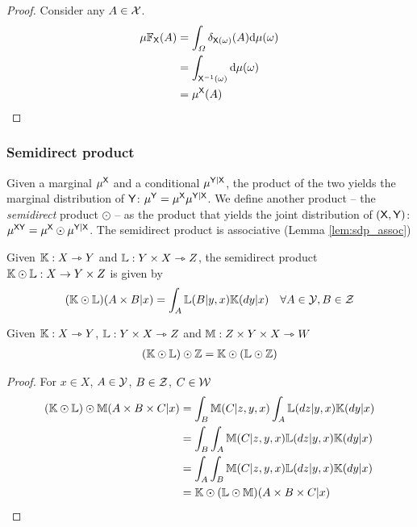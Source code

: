 \begin{proof}
Consider any $A\in \mathcal{X}$.
\begin{align}
	\mu \mathbb{F}_{\mathsf{X}}(A) &= \int_\Omega \delta_{\mathsf{X}(\omega)}(A) \mathrm{d}\mu(\omega)\\
	&= \int_{\mathsf{X}^{-1}(\omega)} \mathrm{d}\mu(\omega)\\
	&= \mu^{\mathsf{X}}(A)
\end{align}
\end{proof}

\subsubsection{Semidirect product}

Given a marginal $\mu^{\mathsf{X}}$ and a conditional $\mu^{\mathsf{Y}|\mathsf{X}}$, the product of the two yields the marginal distribution of $\mathsf{Y}$: $\mu^{\mathsf{Y}}=\mu^{\mathsf{X}}\mu^{\mathsf{Y}|\mathsf{X}}$. We define another product -- the \emph{semidirect} product $\odot$ -- as the product that yields the joint distribution of $(\mathsf{X},\mathsf{Y})$: $\mu^{\mathsf{XY}}=\mu^{\mathsf{X}}\odot\mu^{\mathsf{Y}|\mathsf{X}}$. The semidirect product is associative (Lemma \ref{lem:sdp_assoc})

\begin{definition}\label{def:copyproduct}
Given $\mathbb{K}:X\rightarrowtriangle Y$ and $\mathbb{L}:Y\times X\rightarrowtriangle Z$, the semidirect product $\mathbb{K}\odot\mathbb{L}:X\to Y\times Z$ is given by
\begin{align}
    (\mathbb{K}\odot\mathbb{L})(A\times B|x) &= \int_A \mathbb{L}(B|y,x)\mathbb{K}(dy|x)&\forall A\in \mathcal{Y},B\in\mathcal{Z}
\end{align}
\end{definition}


\begin{lemma}\label{lem:sdp_assoc}
Given $\mathbb{K}:X\rightarrowtriangle Y$, $\mathbb{L}:Y\times X\rightarrowtriangle Z$ and $\mathbb{M}:Z\times Y\times X\rightarrowtriangle W$
\begin{align}
    (\mathbb{K}\odot \mathbb{L})\odot \mathbb{Z} &= \mathbb{K}\odot(\mathbb{L}\odot\mathbb{Z})\\
\end{align}
\end{lemma}

\begin{proof}
For $x\in X$, $A\in \mathcal{Y}$, $B\in \mathcal{Z}$, $C\in \mathcal{W}$
\begin{align}
    (\mathbb{K}\odot \mathbb{L})\odot \mathbb{M}(A\times B\times C |x) &= \int_B \mathbb{M}(C|z, y,x)\int_A \mathbb{L}(dz|y, x)\mathbb{K}(dy|x)\\
    &= \int_B \int_A \mathbb{M}(C|z, y,x)\mathbb{L}(dz|y, x)\mathbb{K}(dy|x)\\
    &= \int_A \int_B \mathbb{M}(C|z, y,x)\mathbb{L}(dz|y, x)\mathbb{K}(dy|x)\\
    &= \mathbb{K}\odot (\mathbb{L}\odot \mathbb{M})(A\times B\times C |x)
\end{align}
\end{proof}

